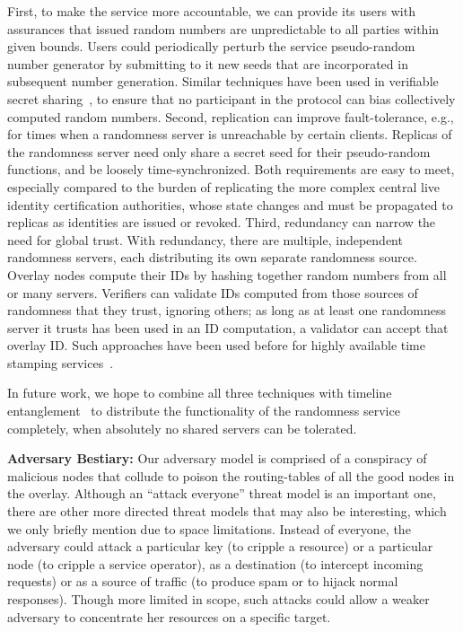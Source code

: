 \documentclass[10pt,twocolumn]{article}
\renewcommand{\paragraph}[1]{\textbf{#1:}}
\begin{document}
First, to make the service more accountable, we can provide its users with
assurances that issued random numbers are unpredictable to all parties
within given bounds. Users could periodically perturb the service pseudo-random
number generator by submitting to it new seeds that are incorporated in
subsequent number generation.  Similar techniques have been used in
verifiable secret sharing~\cite{Pedersen1991}, to ensure that no
participant in the protocol can bias collectively computed random
numbers.
Second, replication can improve fault-tolerance, e.g., for times when a
randomness server is unreachable by certain clients.  Replicas of the
randomness server need only share a secret seed for their pseudo-random
functions, and be loosely time-synchronized.  Both requirements are
easy to meet, especially compared to the burden of replicating
the more complex central live identity certification
authorities, whose state changes and must be propagated to replicas as
identities are issued or revoked.
Third, redundancy can narrow
the need for global trust.  With
redundancy, there are multiple, independent randomness servers, each distributing its
own separate randomness source.  Overlay nodes compute their IDs by
hashing together random numbers from all or many servers.  Verifiers can
validate IDs computed from those sources of randomness that they trust,
ignoring others; as long as at least one randomness server it trusts has
been used in an ID computation, a validator can accept that overlay
ID. Such approaches have been used before for highly available time
stamping services~\cite{Ansper2001}.

In future work, we hope to combine all three techniques with
timeline entanglement~\cite{Maniatis2002b} to distribute the
functionality of the randomness service completely, when
absolutely no shared servers can be tolerated. 


\paragraph{Adversary Bestiary}
Our adversary model is comprised of a conspiracy of malicious nodes that
collude to poison the routing-tables of all the good nodes
in the overlay.  Although an ``attack everyone'' threat model is an
important one, there are other
more directed threat models that may also be interesting, which we only
briefly mention due to space limitations.  Instead of everyone, the adversary could
attack a particular key (to cripple a resource) or a particular node (to
cripple a service operator), as a
destination (to intercept incoming requests) or as a source of traffic
(to produce spam or to hijack normal responses).  Though more
limited in scope, such attacks could
allow a weaker adversary to concentrate her resources on a specific target.
\end{document}
